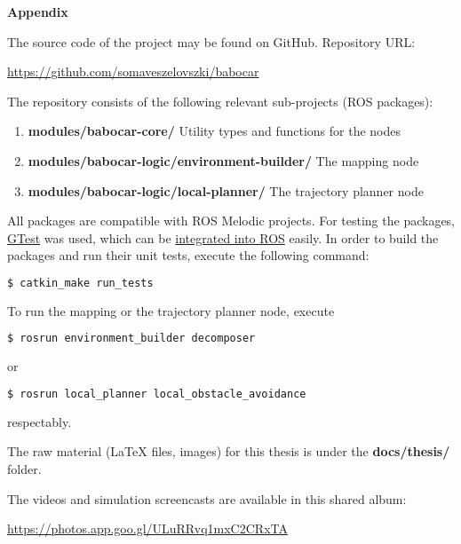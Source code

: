 \appendix

\textbf{Appendix}

The source code of the project may be found on GitHub. Repository URL:

\begin{center}
\href{https://github.com/somaveszelovszki/babocar}{https://github.com/somaveszelovszki/babocar}
\end{center}

The repository consists of the following relevant sub-projects (ROS packages):

\begin{enumerate}
\item \textbf{modules/babocar-core/} Utility types and functions for the nodes
\item \textbf{modules/babocar-logic/environment-builder/} The mapping node
\item \textbf{modules/babocar-logic/local-planner/} The trajectory planner node
\end{enumerate}

All packages are compatible with ROS Melodic projects. For testing the packages, \href{https://github.com/google/googletest}{GTest} was used, which can be \href{http://wiki.ros.org/gtest}{integrated into ROS} easily. In order to build the packages and run their unit tests, execute the following command:

\begin{lstlisting}[language=bash]
$ catkin_make run_tests
\end{lstlisting}

To run the mapping or the trajectory planner node, execute

\begin{lstlisting}[language=bash]
$ rosrun environment_builder decomposer
\end{lstlisting}

or

\begin{lstlisting}[language=bash]
$ rosrun local_planner local_obstacle_avoidance
\end{lstlisting}

respectably.

The raw material (LaTeX files, images) for this thesis is under the \textbf{docs/thesis/} folder.

The videos and simulation screencasts are available in this shared album:

\begin{center}
	\href{https://photos.app.goo.gl/ULuRRvq1mxC2CRxTA}{https://photos.app.goo.gl/ULuRRvq1mxC2CRxTA}
\end{center}